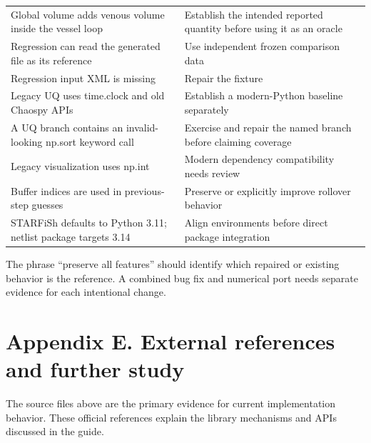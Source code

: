 \documentclass[11pt,a4paper]{article}
\begin{document}
\begin{longtable}{>{\raggedright\arraybackslash}p{}>{\raggedright\arraybackslash}p{}}
Global volume adds venous volume inside the vessel loop & Establish the intended reported quantity before using it as an oracle \\
Regression can read the generated file as its reference & Use independent frozen comparison data \\
Regression input XML is missing & Repair the fixture \\
Legacy UQ uses time.clock and old Chaospy APIs & Establish a modern-Python baseline separately \\
A UQ branch contains an invalid-looking np.sort keyword call & Exercise and repair the named branch before claiming coverage \\
Legacy visualization uses np.int & Modern dependency compatibility needs review \\
Buffer indices are used in previous-step guesses & Preserve or explicitly improve rollover behavior \\
STARFiSh defaults to Python 3.11; netlist package targets 3.14 & Align environments before direct package integration \\
\end{longtable}
\endgroup
The phrase \textquotedblleft{}preserve all features\textquotedblright{} should identify which repaired or existing behavior is the reference. A combined bug fix and numerical port needs separate evidence for each intentional change.

\clearpage
\section{Appendix E. External references and further study}
The source files above are the primary evidence for current implementation behavior. These official references explain the library mechanisms and APIs discussed in the guide.
\end{document}
